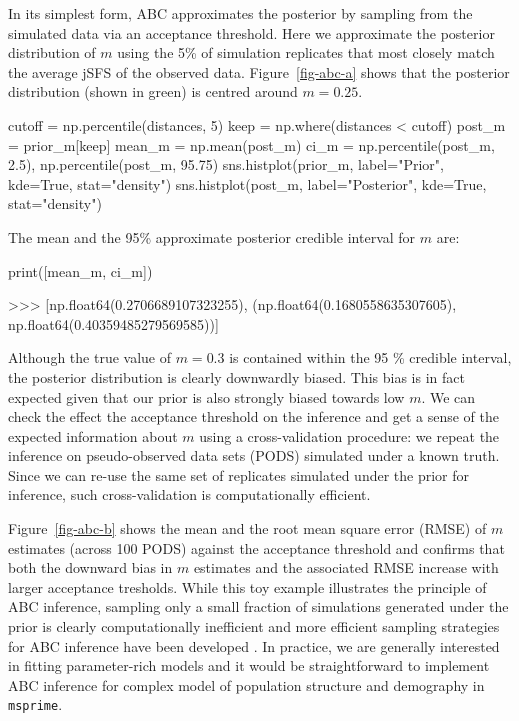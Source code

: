 \documentclass[graybox]{svmult}
\newcommand{\msprime}[0]{\texttt{msprime}}
\begin{document}
    In its simplest form, ABC approximates the posterior by sampling from
the simulated data via an acceptance threshold. Here we approximate the
posterior distribution of \(m\) using the 5\% of simulation replicates
that most closely match the average jSFS of the observed data.
Figure~\ref{fig-abc-a} shows that the posterior
distribution (shown in green) is centred around \(m=0.25\).
\begin{pythoncode}
cutoff = np.percentile(distances, 5)
keep = np.where(distances < cutoff)
post_m = prior_m[keep]
mean_m = np.mean(post_m)
ci_m = np.percentile(post_m, 2.5), np.percentile(post_m, 95.75)
sns.histplot(prior_m, label="Prior", kde=True, stat="density")
sns.histplot(post_m, label="Posterior", kde=True, stat="density")
\end{pythoncode}

The mean and the 95\% approximate posterior credible interval for \(m\)
are:
\begin{pythoncode}
print([mean_m, ci_m])

>>> [np.float64(0.2706689107323255),
    (np.float64(0.1680558635307605),
     np.float64(0.40359485279569585))]
\end{pythoncode}


Although the true value of \(m=0.3\) is contained within the 95 \% credible interval, the posterior distribution is clearly downwardly biased. This bias is in fact expected given that our prior is also strongly biased towards low \(m\). We can check the effect the acceptance threshold on the inference and get a sense of the expected information about \(m\) using a cross-validation procedure: we repeat the inference on pseudo-observed data sets (PODS) simulated under a known truth. Since we can re-use the same set of replicates simulated under the prior for inference, such cross-validation is computationally efficient.

Figure~\ref{fig-abc-b} shows the mean and the root mean square error (RMSE) of \(m\) estimates (across 100 PODS) against the acceptance threshold and confirms that both the downward bias in \(m\) estimates and the associated RMSE increase with larger acceptance tresholds. While this toy example illustrates the principle of ABC inference, sampling only a small fraction of simulations generated under the prior is clearly computationally inefficient and more efficient sampling strategies for ABC inference have been developed \citep{Beaumont2002}. In practice, we are generally interested in fitting parameter-rich models and it would be straightforward to implement ABC inference for complex model of population structure and demography in \msprime.
\end{document}
